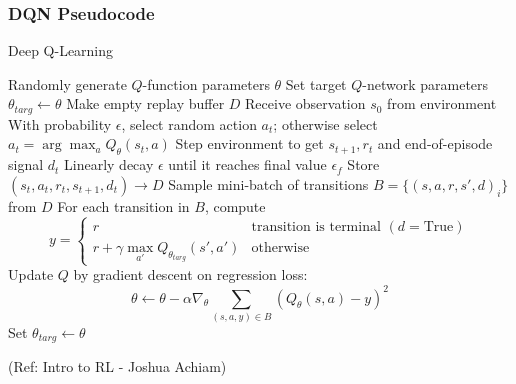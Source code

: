 \begin{frame}[fragile]\frametitle{DQN Pseudocode}

\begin{algorithm}[H]
\tiny
   \caption{Deep Q-Learning}
   \label{alg1}
\begin{algorithmic}
     \STATE Randomly generate $Q$-function parameters $\theta$
     \STATE Set target $Q$-network parameters $\theta_{targ} \leftarrow \theta$
     \STATE Make empty replay buffer $D$
	 \STATE Receive observation $s_0$ from environment
	 \STATE With probability $\epsilon$, select random action $a_t$; otherwise select $a_t = \arg \max_{a} Q_{\theta}(s_t, a)$
	 \STATE Step environment to get $s_{t+1}, r_t$ and end-of-episode signal $d_t$
	 \STATE Linearly decay $\epsilon$ until it reaches final value $\epsilon_f$
	 \STATE Store $(s_t, a_t, r_t, s_{t+1}, d_t) \to D$
	 \STATE Sample mini-batch of transitions $B = \{(s,a,r,s',d)_i\}$ from $ D$
	 \STATE For each transition in $B$, compute 
	 \begin{equation*}
	 y = \left\{ \begin{array}{ll}
	 r & \text{transition is terminal }(d=\text{True}) \\
	 r + \gamma \max_{a'} Q_{\theta_{targ}}(s', a') & \text{otherwise}
	 \end{array}\right.
	 \end{equation*}
	 \STATE Update $Q$ by gradient descent on regression loss:
	 \begin{equation*}
	 \theta \leftarrow \theta - \alpha \nabla_{\theta} \sum_{(s,a,y)\in B} \left(Q_{\theta}(s,a) - y \right)^2
	 \end{equation*}
	 	\STATE Set $\theta_{targ} \leftarrow \theta$
	 \ENDIF
	\ENDFOR
\end{algorithmic}
\end{algorithm}

{\tiny (Ref: Intro to RL - Joshua Achiam)}


\end{frame}
